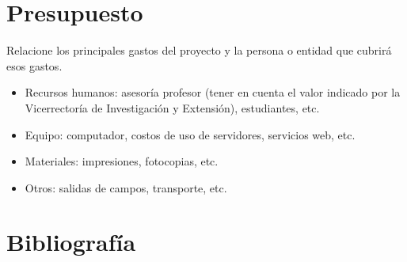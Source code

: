 \documentclass[12pt]{article}
\begin{document}
    \section{Presupuesto}

    Relacione los principales gastos del proyecto y la persona o entidad que cubrirá esos gastos.

    \begin{itemize}
        
        \item Recursos humanos:  asesoría profesor (tener en cuenta el valor indicado por la Vicerrectoría de Investigación y Extensión), estudiantes, etc.
        \item Equipo:  computador, costos de uso de servidores, servicios web, etc.
        \item Materiales:  impresiones, fotocopias, etc.
        \item Otros:  salidas de campos, transporte, etc.
        
    \end{itemize}

    \pagebreak

    \section{Bibliografía}

    \begingroup
    \renewcommand{\section}[2]{}
    \renewcommand{\addcontentsline}[3]{}
    
    \endgroup
\end{document}
